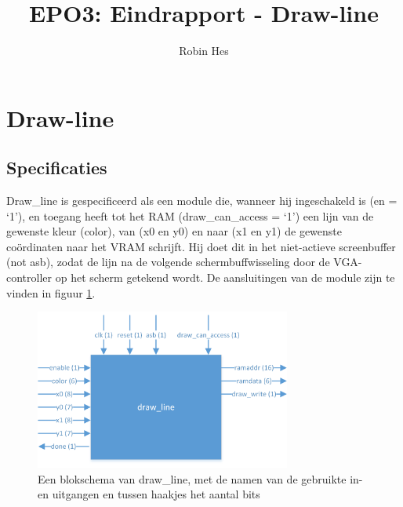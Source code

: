 \documentclass{scrartcl} %
\author{Robin Hes}
\title{EPO3: Eindrapport - Draw-line}
\begin{document}
\section{Draw-line}
\label{sec:draw-line}

\subsection{Specificaties}
Draw\_line is gespecificeerd als een module die, wanneer hij ingeschakeld is (en = `1'), en toegang heeft tot het RAM (draw\_can\_access = `1') een lijn van de gewenste kleur (color), van (x0 en y0) en naar (x1 en y1) de gewenste coördinaten naar het VRAM schrijft. Hij doet dit in het niet-actieve screenbuffer (not asb), zodat de lijn na de volgende schermbuffwisseling door de VGA-controller op het scherm getekend wordt. De aansluitingen van de module zijn te vinden in figuur \ref{fig:draw-line-schema}.

\begin{figure}[H]
	\centering
	\includegraphics[width=0.75\textwidth]{resource/draw_line.png}
	\caption{Een blokschema van draw\_line, met de namen van de gebruikte in- en uitgangen en tussen haakjes het aantal bits}
	\label{fig:draw-line-schema}
\end{figure}

\end{document}
